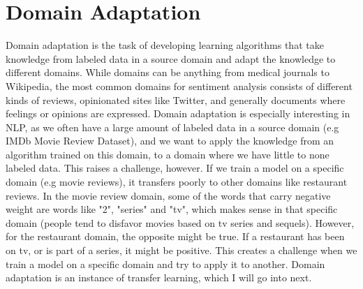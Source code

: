 \section{Domain Adaptation}
Domain adaptation is the task of developing learning algorithms that take knowledge from labeled data in a source domain and adapt the knowledge to different domains. While domains can be anything from medical journals to Wikipedia, the most common domains for sentiment analysis consists of different kinds of reviews, opinionated sites like Twitter, and generally documents where feelings or opinions are expressed. Domain adaptation is especially interesting in NLP, as we often have a large amount of labeled data in a source domain (e.g IMDb Movie Review Dataset), and we want to apply the knowledge from an algorithm trained on this domain, to a domain where we have little to none labeled data. \cite{daume-iii-2007-frustratingly} This raises a challenge, however. If we train a model on a specific domain (e.g movie reviews), it transfers poorly to other domains like restaurant reviews. In the movie review domain, some of the words that carry negative weight are words like "2", "series" and "tv", which makes sense in that specific domain (people tend to disfavor movies based on tv series and sequels). However, for the restaurant domain, the opposite might be true. If a restaurant has been on tv, or is part of a series, it might be positive. This creates a challenge when we train a model on a specific domain and try to apply it to another. Domain adaptation is an instance of transfer learning, which I will go into next.


